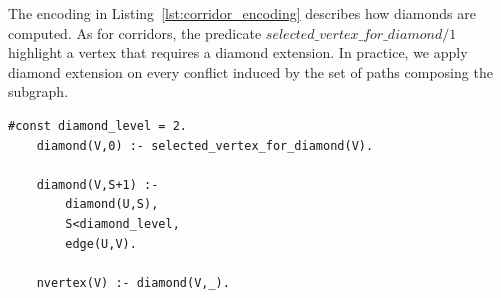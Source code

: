 The encoding in Listing~\ref{lst:corridor_encoding} describes how diamonds are computed. As for corridors, the predicate \(selected\_vertex\_for\_diamond/1\) highlight a vertex that requires a diamond extension. In practice, we apply diamond extension on every conflict induced by the set of paths composing the subgraph. 

\begin{minipage}[H]{\linewidth}
\begin{lstlisting}[style=mystyle, caption={Diamond extension encoding}, label={lst:diamond_encoding}]
    #const diamond_level = 2.
    diamond(V,0) :- selected_vertex_for_diamond(V).
    
    diamond(V,S+1) :- 
        diamond(U,S), 
        S<diamond_level, 
        edge(U,V).
    
    nvertex(V) :- diamond(V,_).
\end{lstlisting}
\end{minipage}

